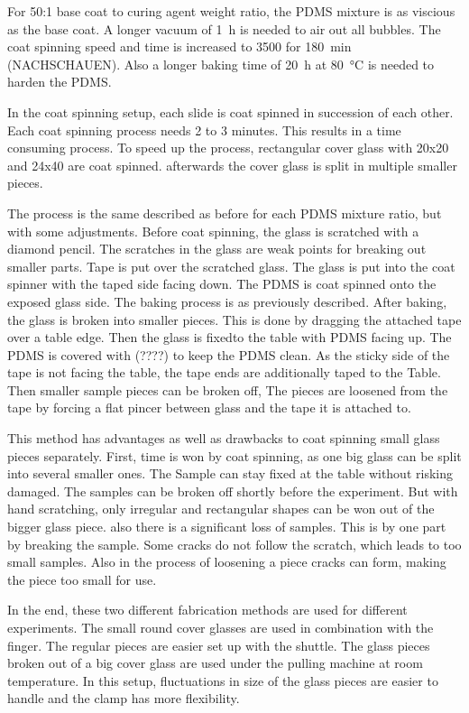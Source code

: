 For 50:1 base coat to curing agent weight ratio, the PDMS mixture is as viscious as the base coat. A longer vacuum of \SI{1}{\hour} is needed to air out all bubbles. The coat spinning speed and time is increased to \SI{3500}{\rpm} for \SI{180}{\minute} (NACHSCHAUEN). Also a longer baking time of \SI{20}{\hour} at \SI{80}{\degreeCelsius} is needed to harden the PDMS. 

In the coat spinning setup, each slide is coat spinned in succession of each other. Each coat spinning process needs 2 to 3 minutes. This results in a time consuming process. To speed up the process, rectangular cover glass with 20x20 and 24x40 are coat spinned. afterwards the cover glass is split in multiple smaller pieces. 

The process is the same described as before for each PDMS mixture ratio, but with some adjustments. Before coat spinning, the glass is scratched with a diamond pencil. The scratches in the glass are weak points for breaking out smaller parts. Tape is put over the scratched glass. The glass is put into the coat spinner with the taped side facing down. The PDMS is coat spinned onto the exposed glass side. The baking process is as previously described. After baking, the glass is broken into smaller pieces. This is done by dragging the attached tape over a table edge. Then the glass is fixedto the table with PDMS facing up. The PDMS is covered with (????) to keep the PDMS clean. As the sticky side of the tape is not facing the table, the tape ends are additionally taped to the Table. Then smaller sample pieces can be broken off, The pieces are loosened from the tape by forcing a flat pincer between glass and the tape it is attached to.

This method has advantages as well as drawbacks to coat spinning small glass pieces separately. First, time is won by coat spinning, as one big glass can be split into several smaller ones. The Sample can stay fixed at the table without risking damaged. The samples can be broken off shortly before the experiment. But with hand scratching, only irregular and rectangular shapes can be won out of the bigger glass piece. also there is a significant loss of samples. This is by one part by breaking the sample. Some cracks do not follow the scratch, which leads to too small samples. Also in the process of loosening a piece cracks can form, making the piece too small for use.

In the end, these two different fabrication methods are used for different experiments. The small round cover glasses are used in combination with the finger. The regular pieces are easier set up with the shuttle. The glass pieces broken out of a big cover glass are used under the pulling machine at room temperature. In this setup, fluctuations in size of the glass pieces are easier to handle and the clamp has more flexibility.

